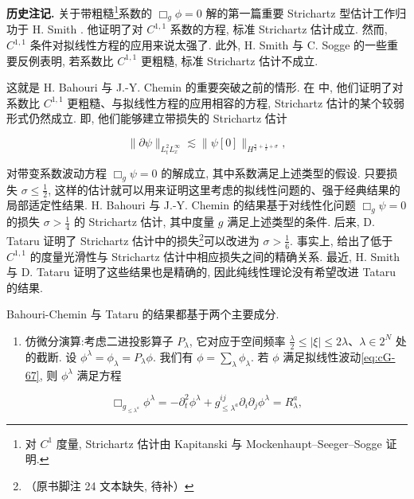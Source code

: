 \textbf{历史注记.} 关于带粗糙\footnote{对 $C^1$ 度量, Strichartz 估计由 Kapitanski \cite{gfref25} 与 Mockenhaupt--Seeger--Sogge \cite{gfref52} 证明.}系数的 $\Box_{g}\phi=0$ 解的第一篇重要 Strichartz 型估计工作归功于 H. Smith \cite{gfref60}. 他证明了对 $C^{1, 1}$ 系数的方程, 标准 Strichartz 估计成立. 然而, $C^{1, 1}$ 条件对拟线性方程的应用来说太强了. 此外, H. Smith 与 C. Sogge \cite{gfref61} 的一些重要反例表明, 若系数比 $C^{1, 1}$ 更粗糙, 标准 Strichartz 估计不成立. 

这就是 H. Bahouri 与 J.-Y. Chemin 的重要突破之前的情形. 在 \cite{gfref1} 中, 他们证明了对系数比 $C^{1, 1}$ 更粗糙、与拟线性方程的应用相容的方程, Strichartz 估计的某个较弱形式仍然成立. 即, 他们能够建立带损失的 Strichartz 估计

\begin{equation}
\| \partial \psi \| _ {L _ {t} ^ {2} L _ {x} ^ {\infty}} \lesssim \| \psi [ 0 ] \| _ {H ^ {\frac {n}{2} + \frac {1}{2} + \sigma}}, \label{eq:cG-68}
\end{equation}

对带变系数波动方程 $\Box_{g}\psi = 0$ 的解成立, 其中系数满足上述类型的假设. 只要损失 $\sigma \leq \frac{1}{2}$, 这样的估计就可以用来证明这里考虑的拟线性问题的、强于经典结果的局部适定性结果. H. Bahouri 与 J.-Y. Chemin 的结果基于对线性化问题 $\Box_{g}\psi = 0$ 的损失 $\sigma > \frac{1}{4}$ 的 Strichartz 估计, 其中度量 $g$ 满足上述类型的条件. 后来, D. Tataru \cite{gfref72} 证明了 Strichartz 估计中的损失\footnote{（原书脚注 24 文本缺失, 待补）}可以改进为 $\sigma > \frac{1}{6}$. 事实上, \cite{gfref72} 给出了低于 $C^{1, 1}$ 的度量光滑性与 Strichartz 估计中相应损失之间的精确关系. 最近, H. Smith 与 D. Tataru \cite{gfref62} 证明了这些结果也是精确的, 因此纯线性理论没有希望改进 Tataru 的结果. 

Bahouri-Chemin 与 Tataru 的结果都基于两个主要成分. 

\begin{enumerate}
\def\labelenumi{\alph{enumi})}
\item 仿微分演算:考虑二进投影算子 $P_{\lambda}$, 它对应于空间频率 $\frac{\lambda}{2} \leq |\xi| \leq 2\lambda$、$\lambda \in 2^{N}$ 处的截断. 设 $\phi^{\lambda} = \phi_{\lambda} = P_{\lambda}\phi$. 我们有 $\phi = \sum_{\lambda} \phi_{\lambda}$. 若 $\phi$ 满足拟线性波动\eqref{eq:cG-67}, 则 $\phi^{\lambda}$ 满足方程
\end{enumerate}

\begin{equation}
\Box_ {g _ {\leq \lambda^ {a}}} \phi^ {\lambda} = - \partial_ {t} ^ {2} \phi^ {\lambda} + g _ {\leq \lambda^ {a}} ^ {i j} \partial_ {i} \partial_ {j} \phi^ {\lambda} = R _ {\lambda} ^ {a}, \label{eq:cG-69}
\end{equation}

